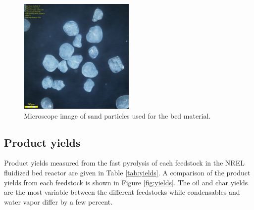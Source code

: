 \begin{figure}[H]
    \centering
    \includegraphics[width=0.5\textwidth]{figures/sand.jpg}
    \caption{Microscope image of sand particles used for the bed material.}
    \label{fig:sand}
\end{figure}

\subsection{Product yields}

Product yields measured from the fast pyrolysis of each feedstock in the NREL fluidized bed reactor are given in Table \ref{tab:yields}. A comparison of the product yields from each feedstock is shown in Figure \ref{fig:yields}. The oil and char yields are the most variable between the different feedstocks while condensables and water vapor differ by a few percent.

